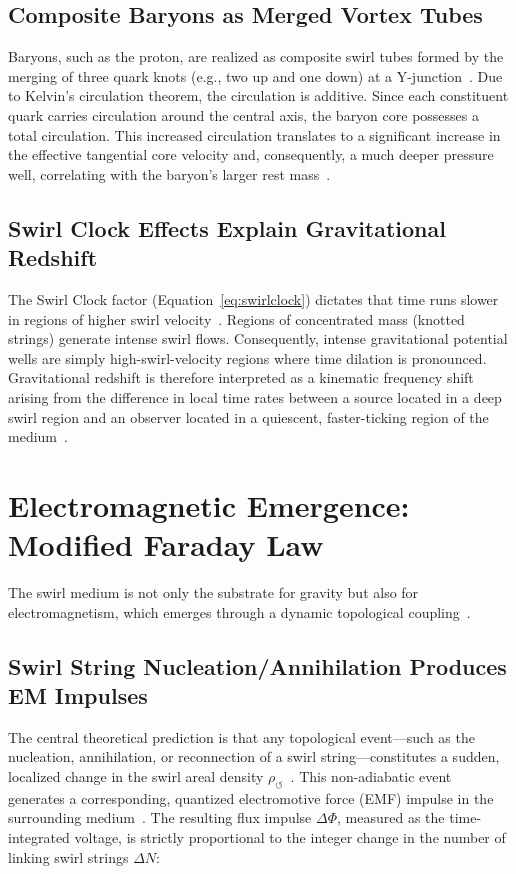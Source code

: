 \documentclass[10pt,reprint,aps,onecolumn,nofootinbib]{revtex4-2}
\begin{document}
\subsection*{Composite Baryons as Merged Vortex Tubes}
Baryons, such as the proton, are realized as composite swirl tubes formed by the merging of three quark knots (e.g., two up and one down) at a Y-junction~\cite{3}. Due to Kelvin's circulation theorem, the circulation is additive. Since each constituent quark carries circulation around the central axis, the baryon core possesses a total circulation. This increased circulation translates to a significant increase in the effective tangential core velocity and, consequently, a much deeper pressure well, correlating with the baryon's larger rest mass~\cite{3}.

\subsection*{Swirl Clock Effects Explain Gravitational Redshift}
The Swirl Clock factor (Equation~\ref{eq:swirlclock}) dictates that time runs slower in regions of higher swirl velocity~\cite{1}. Regions of concentrated mass (knotted strings) generate intense swirl flows. Consequently, intense gravitational potential wells are simply high-swirl-velocity regions where time dilation is pronounced. Gravitational redshift is therefore interpreted as a kinematic frequency shift arising from the difference in local time rates between a source located in a deep swirl region and an observer located in a quiescent, faster-ticking region of the medium~\cite{1}.

\section{Electromagnetic Emergence: Modified Faraday Law}
\label{sec:em}

The swirl medium is not only the substrate for gravity but also for electromagnetism, which emerges through a dynamic topological coupling~\cite{2}.

\subsection*{Swirl String Nucleation/Annihilation Produces EM Impulses}

The central theoretical prediction is that any topological event---such as the nucleation, annihilation, or reconnection of a swirl string---constitutes a sudden, localized change in the swirl areal density $\rho_{\circlearrowleft}$~\cite{2}. This non-adiabatic event generates a corresponding, quantized electromotive force (EMF) impulse in the surrounding medium~\cite{2}. The resulting flux impulse $\Delta\Phi$, measured as the time-integrated voltage, is strictly proportional to the integer change in the number of linking swirl strings $\Delta N$:
\end{document}

